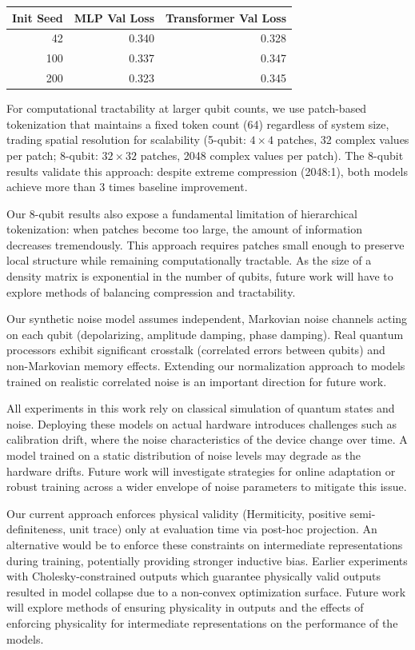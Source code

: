 \documentclass{ieeeqccl}
\begin{document}
\begin{center}
\begin{tabular}{rrr}
Init Seed & MLP Val Loss & Transformer Val Loss\\[0pt]
\hline
42 & 0.340 & 0.328\\[0pt]
100 & 0.337 & 0.347\\[0pt]
200 & 0.323 & 0.345\\[0pt]
\end{tabular}
\end{center}

For computational tractability at larger qubit counts, we use patch-based tokenization that maintains a fixed token count (64) regardless of system size, trading spatial resolution for scalability (5-qubit: \(4\times 4\) patches, 32 complex values per patch; 8-qubit: \(32\times 32\) patches, 2048 complex values per patch).  The 8-qubit results validate this approach: despite extreme compression (2048:1), both models achieve more than 3 times baseline improvement.

Our 8-qubit results also expose a fundamental limitation of hierarchical tokenization: when patches become too large, the amount of information decreases tremendously.  This approach requires patches small enough to preserve local structure while remaining computationally tractable.  As the size of a density matrix is exponential in the number of qubits, future work will have to explore methods of balancing compression and tractability.

Our synthetic noise model assumes independent, Markovian noise channels acting on each qubit (depolarizing, amplitude damping, phase damping).  Real quantum processors exhibit significant crosstalk (correlated errors between qubits) and non-Markovian memory effects.  Extending our normalization approach to models trained on realistic correlated noise is an important direction for future work.

All experiments in this work rely on classical simulation of quantum states and noise.  Deploying these models on actual hardware introduces challenges such as calibration drift, where the noise characteristics of the device change over time.  A model trained on a static distribution of noise levels may degrade as the hardware drifts.  Future work will investigate strategies for online adaptation or robust training across a wider envelope of noise parameters to mitigate this issue.

Our current approach enforces physical validity (Hermiticity, positive semi-definiteness, unit trace) only at evaluation time via post-hoc projection.  An alternative would be to enforce these constraints on intermediate representations during training, potentially providing stronger inductive bias.  Earlier experiments with Cholesky-constrained outputs which guarantee physically valid outputs resulted in model collapse due to a non-convex optimization surface.  Future work will explore methods of ensuring physicality in outputs and the effects of enforcing physicality for intermediate representations on the performance of the models. 
\end{document}
